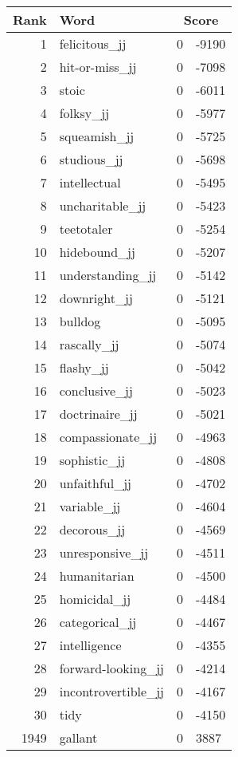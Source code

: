 \begin{longtable}[!htbp]{| rlr@{.}l |}
    \hline
    \textbf{Rank} & \textbf{Word} & \multicolumn{2}{c|}{\textbf{Score}} \\
    \hline
    \endhead
    1 & felicitous\_jj & 0 & -9190 \\
    2 & hit-or-miss\_jj & 0 & -7098 \\
    3 & stoic & 0 & -6011 \\
    4 & folksy\_jj & 0 & -5977 \\
    5 & squeamish\_jj & 0 & -5725 \\
    6 & studious\_jj & 0 & -5698 \\
    7 & intellectual & 0 & -5495 \\
    8 & uncharitable\_jj & 0 & -5423 \\
    9 & teetotaler & 0 & -5254 \\
    10 & hidebound\_jj & 0 & -5207 \\
    11 & understanding\_jj & 0 & -5142 \\
    12 & downright\_jj & 0 & -5121 \\
    13 & bulldog & 0 & -5095 \\
    14 & rascally\_jj & 0 & -5074 \\
    15 & flashy\_jj & 0 & -5042 \\
    16 & conclusive\_jj & 0 & -5023 \\
    17 & doctrinaire\_jj & 0 & -5021 \\
    18 & compassionate\_jj & 0 & -4963 \\
    19 & sophistic\_jj & 0 & -4808 \\
    20 & unfaithful\_jj & 0 & -4702 \\
    21 & variable\_jj & 0 & -4604 \\
    22 & decorous\_jj & 0 & -4569 \\
    23 & unresponsive\_jj & 0 & -4511 \\
    24 & humanitarian & 0 & -4500 \\
    25 & homicidal\_jj & 0 & -4484 \\
    26 & categorical\_jj & 0 & -4467 \\
    27 & intelligence & 0 & -4355 \\
    28 & forward-looking\_jj & 0 & -4214 \\
    29 & incontrovertible\_jj & 0 & -4167 \\
    30 & tidy & 0 & -4150 \\
    1949 & gallant & 0 & 3887 \\

\end{longtable}
